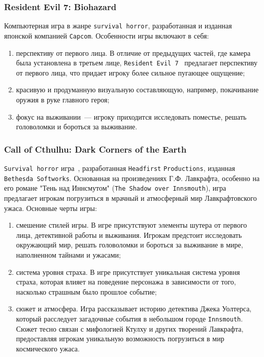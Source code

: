 \subsubsection{Resident Evil 7: Biohazard}

Компьютерная игра в жанре \texttt{survival horror}, разработанная и изданная японской компанией \texttt{Capcom}. Особенности игры включают в себя:
\begin{enumerate}
\item  перспективу от первого лица. В отличие от предыдущих частей, где камера была установлена в третьем лице, \texttt{Resident Evil 7}~\cite{enwiki:1188461634} предлагает перспективу от первого лица, что придает игроку более сильное пугающее ощущение;
\item  красивую и продуманную визуальную составляющую, например, покачивание оружия в руке главного героя;
\item  фокус на выживании~--- игроку приходится исследовать поместье, решать головоломки и бороться за выживание.
\end{enumerate}

\subsubsection{Call of Cthulhu: Dark Corners of the Earth}

\texttt{Survival horror} игра~\cite{enwiki:1182890909}, разработанная \texttt{Headfirst} \texttt{Productions}, изданная \texttt{Bethesda Softworks}. Основанная на произведениях Г.Ф. Лавкрафта, особенно на его романе "Тень над Иннсмутом" (\texttt{The Shadow over Innsmouth}), игра предлагает игрокам погрузиться в мрачный и атмосферный мир Лавкрафтовского ужаса. Основные черты игры:
\begin{enumerate}
\item  смешение стилей игры. В игре присутствуют элементы шутера от первого лица, детективной работы и выживания. Игрокам предстоит исследовать окружающий мир, решать головоломки и бороться за выживание в мире, наполненном тайнами и ужасами;
\item  система уровня страха. В игре присутствует уникальная система уровня страха, которая влияет на поведение персонажа в зависимости от того, насколько страшным было прошлое событие;
\item  сюжет и атмосфера. Игра рассказывает историю детектива Джека Уолтерса, который расследует загадочные события в небольшом городе \texttt{Innsmouth}. Сюжет тесно связан с мифологией Ктулху и других творений Лавкрафта, предоставляя игрокам уникальную возможность погрузиться в мир космического ужаса.
\end{enumerate}

